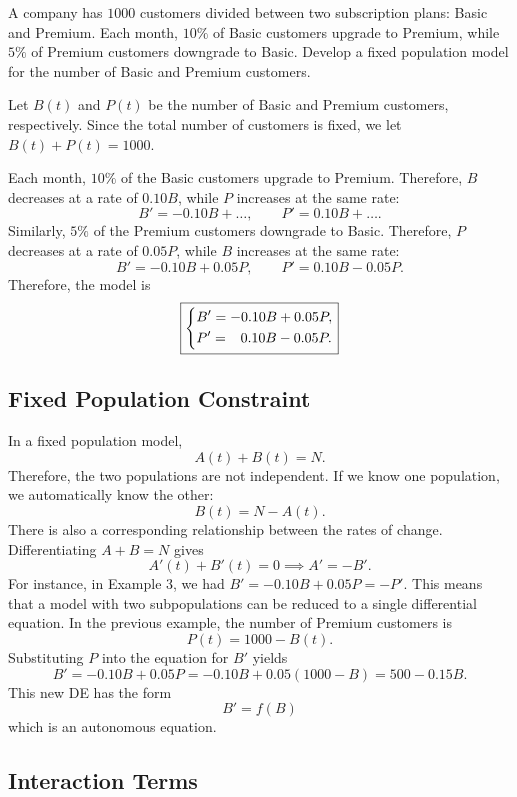 \documentclass[10pt,letterpaper]{article}
\begin{document}

\begin{example}[4]{
A company has $1000$ customers divided between two subscription plans:
Basic and Premium. Each month, $10\%$ of Basic customers upgrade to Premium,
while $5\%$ of Premium customers downgrade to Basic. Develop a fixed population model for
the number of Basic and Premium customers.
}

Let $B(t)$ and $P(t)$ be the number of Basic and Premium customers, respectively.
Since the total number of customers is fixed, we let $B(t)+P(t)=1000$. 

Each month, $10\%$ of the Basic customers upgrade to Premium. Therefore,
$B$ decreases at a rate of $0.10B$, while $P$ increases at the same rate:
\[
B'=-0.10B+\ldots,
\qquad
P'=0.10B+\ldots.
\]
Similarly, $5\%$ of the Premium customers downgrade to Basic. Therefore,
$P$ decreases at a rate of $0.05P$, while $B$ increases at the same rate:
\[
B'=-0.10B+0.05P,
\qquad
P'=0.10B-0.05P.
\]
Therefore, the model is
\[
\boxed{
\begin{dcases}
B'=-0.10B+0.05P,\\
P'=\phantom{-}0.10B-0.05P.
\end{dcases}
}
\]
\end{example}

\subsection{Fixed Population Constraint}

In a fixed population model,
\[
A(t)+B(t)=N.
\]
Therefore, the two populations are not independent. If we know one
population, we automatically know the other:
\[
B(t)=N-A(t).
\]
There is also a corresponding relationship between the rates of change.
Differentiating $A+B=N$ gives
\[
A'(t)+B'(t)=0 \implies A' =-B'.
\]
For instance, in Example 3, we had $B'=-0.10B+0.05P = -P'$.  
This means that a model with two subpopulations can be reduced to a single differential equation. In the previous example, the number of Premium customers is 
\[
P(t)=1000-B(t).
\]
Substituting $P$ into the equation for $B'$ yields 
$$
B'=-0.10B+0.05P =-0.10B+0.05(1000-B)=500-0.15B.
$$
This new DE has the form 
$$
B'=f(B)
$$
which is an autonomous equation.

\subsection{Interaction Terms}
\end{document}
